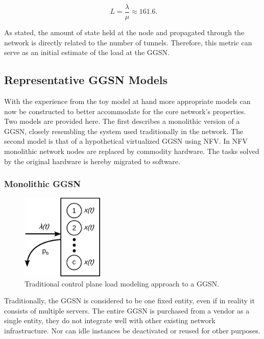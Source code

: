 \begin{equation}
\phantom{.}L=\frac{\lambda}{\mu}\approx 161.6\text{.} %
\end{equation}

As stated, the amount of state held at the node and propagated through the network is directly related to the number of tunnels. Therefore, this metric can serve as an initial estimate of the load at the \gls{GGSN}.


\subsection{Representative GGSN Models} 

With the experience from the toy model at hand more appropriate models can now be constructed to better accommodate for the core network's properties. Two models are provided here.
The first describes a monolithic version of a \gls{GGSN}, closely resembling the system used traditionally in the network. The second model is that of a hypothetical virtualized \gls{GGSN} using \gls{NFV}. In \gls{NFV}~\cite{nfv_whitepaper} monolithic network nodes are replaced by commodity hardware. The tasks solved by the original hardware is hereby migrated to software.


\subsubsection{Monolithic \texorpdfstring{\acrshort{GGSN}}{GGSN}}

\begin{figure}[htb]
	\centering
	\includegraphics[width=0.35\textwidth]{images/ggsn-monolithic.pdf}
	\caption{Traditional control plane load modeling approach to a \gls{GGSN}.}
\label{c4:fig:model-ggsn-monolithic}
\end{figure}

Traditionally, the \gls{GGSN} is considered to be one fixed entity, even if in reality it consists of multiple servers. The entire \gls{GGSN} is purchased from a vendor as a single entity, they do not integrate well with other existing network infrastructure. Nor can idle instances be deactivated or reused for other purposes.

